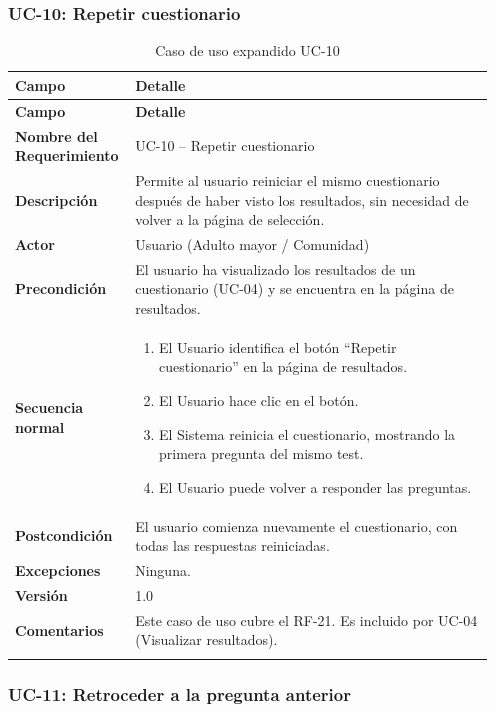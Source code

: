 \subsubsection{UC-10: Repetir cuestionario}

\begin{longtable}{p{0.22\linewidth} p{0.73\linewidth}}
\toprule
\rowcolor{tableheader!20}
\textbf{Campo} & \textbf{Detalle} \\
\midrule
\endfirsthead
\rowcolor{tableheader!20}
\textbf{Campo} & \textbf{Detalle} \\
\midrule
\endhead
\bottomrule
\endfoot
\textbf{Nombre del Requerimiento} & UC-10 -- Repetir cuestionario \\
\textbf{Descripción} & Permite al usuario reiniciar el mismo cuestionario después de haber visto los resultados, sin necesidad de volver a la página de selección. \\
\textbf{Actor} & Usuario (Adulto mayor / Comunidad) \\
\textbf{Precondición} & El usuario ha visualizado los resultados de un cuestionario (UC-04) y se encuentra en la página de resultados. \\
\textbf{Secuencia normal} & 
  \begin{enumerate}
    \item El Usuario identifica el botón ``Repetir cuestionario'' en la página de resultados.
    \item El Usuario hace clic en el botón.
    \item El Sistema reinicia el cuestionario, mostrando la primera pregunta del mismo test.
    \item El Usuario puede volver a responder las preguntas.
  \end{enumerate} \\
\textbf{Postcondición} & El usuario comienza nuevamente el cuestionario, con todas las respuestas reiniciadas. \\
\textbf{Excepciones} & Ninguna. \\
\textbf{Versión} & 1.0 \\
\textbf{Comentarios} & Este caso de uso cubre el RF-21. Es incluido por UC-04 (Visualizar resultados). \\
\bottomrule
\caption{Caso de uso expandido UC-10}
\label{tab:uc10}
\end{longtable}

\subsubsection{UC-11: Retroceder a la pregunta anterior}

